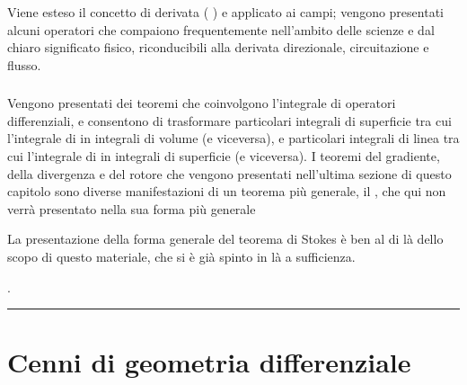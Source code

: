 \documentclass[letterpaper,10pt,italian]{jupyterBook}
\begin{document}
\subsubsection*{}

\sphinxAtStartPar
Viene esteso il concetto di derivata ( ) e applicato ai campi; vengono presentati alcuni operatori che compaiono frequentemente nell’ambito delle scienze e dal chiaro significato fisico, riconducibili alla derivata direzionale, circuitazione e flusso.
\subsubsection*{}

\sphinxAtStartPar
Vengono presentati dei teoremi che coinvolgono l’integrale di operatori differenziali, e consentono di trasformare particolari integrali di superficie \sphinxhyphen{} tra cui l’integrale di  \sphinxhyphen{} in integrali di volume (e viceversa), e particolari integrali di linea \sphinxhyphen{} tra cui l’integrale di  \sphinxhyphen{} in integrali di superficie (e viceversa). I teoremi del gradiente, della divergenza e del rotore che vengono presentati nell’ultima sezione di questo capitolo  sono diverse manifestazioni di un teorema più generale, il , che qui non verrà presentato nella sua forma più generale%
\begin{footnote}[1]\sphinxAtStartFootnote
La presentazione della forma generale del teorema di Stokes è ben al di là dello scopo di questo materiale, che si è già spinto in là a sufficienza.
%
\end{footnote}.




\bigskip\hrule\bigskip


\sphinxstepscope


\section{Cenni di geometria differenziale}
\label{\detokenize{ch/vector-calculus/geometry:cenni-di-geometria-differenziale}}\label{\detokenize{ch/vector-calculus/geometry:vector-calculus-geometry}}\label{\detokenize{ch/vector-calculus/geometry::doc}}
\end{document}
